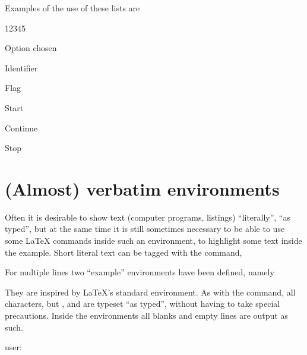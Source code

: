 \bigskip
Examples of the use of these lists are

\begin{example}
\begin{DLtt}{12345}
  \item[CHOPT] Option chosen
  \item[ID]    Identifier
  \item[IFLAG] Flag
    \begin{DLtt}{1}
      \item[0] Start
      \item[1] Continue
      \item[2] Stop
    \end{DLtt}
\end{DLtt}
\end{example}

\section{(Almost) verbatim environments}

Often it is desirable to show text (computer programs, listings) 
``literally'', \ie ``as typed'', but at the same time it is still
sometimes necessary to be able to use some \LaTeX{} commands inside such an
environment, \eg to highlight some text inside the example.
Short literal text can be tagged with the
 command, \eg 


For multiple lines two ``example'' environments have been defined,
namely 


\medskip

They are inspired by \LaTeX's standard  environment.
As with the  command, all characters, but \bs{}, \lcb{} and \rcb{} 
are typeset ``as typed'', \ie without having to take special precautions.
Inside the  environments all blanks and empty lines are output as such.

\begin{example}
\begin{XMP}
user: 
\end{XMP}
\end{example}

